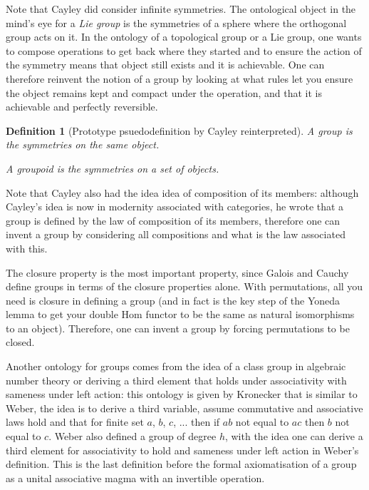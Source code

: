 \documentclass{tufte-book}
\newtheorem{definition}[theorem]{Definition}
\begin{document}
Note that Cayley did consider infinite symmetries. The ontological object in the mind's eye for a \textit{Lie group} is the symmetries of a sphere where the orthogonal group acts on it. In the ontology of a topological group or a Lie group, one wants to compose operations to get back where they started and to ensure the action of the symmetry means that object still exists and it is achievable. One can therefore reinvent the notion of a group by looking at what rules let you ensure the object remains kept and compact under the operation, and that it is achievable and perfectly reversible.

\begin{definition}[Prototype psuedodefinition by Cayley reinterpreted]
  A group is the symmetries on the same object.
  
  A groupoid is the symmetries on a set of objects.
\end{definition}

Note that Cayley also had the idea idea of composition of its members: although Cayley's idea is now in modernity associated with categories, he wrote that a group is defined by the law of composition of its members, therefore one can invent a group by considering all compositions and what is the law associated with this.

The closure property is the most important property, since Galois and Cauchy define groups in terms of the closure properties alone. With permutations, all you need is closure in defining a group (and in fact is the key step of the Yoneda lemma to get your double Hom functor to be the same as natural isomorphisms to an object). Therefore, one can invent a group by forcing permutations to be closed.

Another ontology for groups comes from the idea of a class group in algebraic number theory or deriving a third element that holds under associativity with sameness under left action: this ontology is given by Kronecker that is similar to Weber, the idea is to derive a third variable, assume commutative and associative laws hold and that for finite set $a$, $b$, $c$, ... then if $ab$ not equal to $ac$ then $b$ not equal to $c$. Weber also defined a group of degree $h$, with the idea one can derive a third element for associativity to hold and sameness under left action in Weber's definition. This is the last definition before the formal axiomatisation of a group as a unital associative magma with an invertible operation.
\end{document}
